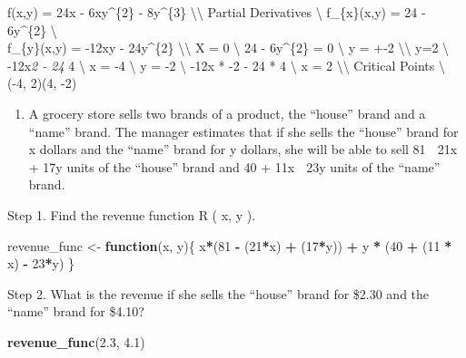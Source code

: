 \documentclass[
]{article}
\newenvironment{Shaded}{\begin{snugshade}}{\end{snugshade}}
\newcommand{\ControlFlowTok}[1]{\textcolor[rgb]{0.13,0.29,0.53}{\textbf{#1}}}
\newcommand{\DecValTok}[1]{\textcolor[rgb]{0.00,0.00,0.81}{#1}}
\newcommand{\FloatTok}[1]{\textcolor[rgb]{0.00,0.00,0.81}{#1}}
\newcommand{\KeywordTok}[1]{\textcolor[rgb]{0.13,0.29,0.53}{\textbf{#1}}}
\newcommand{\NormalTok}[1]{#1}
\newcommand{\OperatorTok}[1]{\textcolor[rgb]{0.81,0.36,0.00}{\textbf{#1}}}
\newcommand{\StringTok}[1]{\textcolor[rgb]{0.31,0.60,0.02}{#1}}
\providecommand{\tightlist}{%
  \setlength{\itemsep}{0pt}\setlength{\parskip}{0pt}}
\begin{document}
f(x,y) = 24x - 6xy\^{}\{2\} - 8y\^{}\{3\} \textbackslash\textbackslash{}
Partial Derivatives \textbackslash{} f\_\{x\}(x,y) = 24 - 6y\^{}\{2\}
\textbackslash{}\\
f\_\{y\}(x,y) = -12xy - 24y\^{}\{2\} \textbackslash\textbackslash{} X =
0 \textbackslash{} 24 - 6y\^{}\{2\} = 0 \textbackslash{} y = +-2
\textbackslash\textbackslash{} y=2 \textbackslash{} -12x\emph{2 - 24 } 4
\textbackslash{} x = -4 \textbackslash{} y = -2 \textbackslash{} -12x *
-2 - 24 * 4 \textbackslash{} x = 2 \textbackslash\textbackslash{}
Critical Points \textbackslash{} (-4, 2)(4, -2)

\begin{enumerate}
\def\labelenumi{\arabic{enumi}.}
\setcounter{enumi}{2}
\tightlist
\item
  A grocery store sells two brands of a product, the ``house'' brand and
  a ``name'' brand. The manager estimates that if she sells the
  ``house'' brand for x dollars and the ``name'' brand for y dollars,
  she will be able to sell 81  21x + 17y units of the ``house'' brand
  and 40 + 11x  23y units of the ``name'' brand.
\end{enumerate}

Step 1. Find the revenue function R ( x, y ).

\begin{Shaded}
\begin{Highlighting}[]
\NormalTok{revenue_func <-}\StringTok{ }\ControlFlowTok{function}\NormalTok{(x, y)\{}
\NormalTok{  x}\OperatorTok{*}\NormalTok{(}\DecValTok{81} \OperatorTok{-}\StringTok{ }\NormalTok{(}\DecValTok{21}\OperatorTok{*}\NormalTok{x) }\OperatorTok{+}\StringTok{ }\NormalTok{(}\DecValTok{17}\OperatorTok{*}\NormalTok{y)) }\OperatorTok{+}\StringTok{ }\NormalTok{y }\OperatorTok{*}\StringTok{ }\NormalTok{(}\DecValTok{40} \OperatorTok{+}\StringTok{ }\NormalTok{(}\DecValTok{11} \OperatorTok{*}\StringTok{ }\NormalTok{x) }\OperatorTok{-}\StringTok{ }\DecValTok{23}\OperatorTok{*}\NormalTok{y)}
\NormalTok{\}}
\end{Highlighting}
\end{Shaded}

Step 2. What is the revenue if she sells the ``house'' brand for \$2.30
and the ``name'' brand for \$4.10?

\begin{Shaded}
\begin{Highlighting}[]
\KeywordTok{revenue_func}\NormalTok{(}\FloatTok{2.3}\NormalTok{, }\FloatTok{4.1}\NormalTok{)}
\end{Highlighting}
\end{Shaded}
\end{document}
